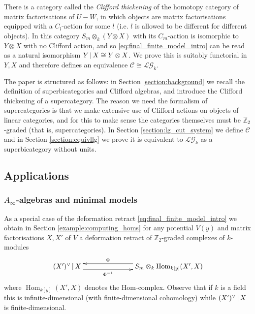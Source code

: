 \documentclass[english,letter paper,12pt,leqno]{article}
\theoremstyle{example}
\numberwithin{equation}{section}
\def\LG{\mathcal{LG}}
\def\Hom{\operatorname{Hom}}
\def\nZ{\mathds{Z}}
\def\L{\mathcal{C}}
\begin{document}
There is a category called the \emph{Clifford thickening} of the homotopy category of matrix factorisations of $U - W$, in which objects are matrix factorisations equipped with a $C_l$-action for some $l$ (i.e. $l$ is allowed to be different for different objects). In this category $S_m \otimes_{k} ( Y \otimes X )$ with its $C_m$-action is isomorphic to $Y \otimes X$ with no Clifford action, and so \eqref{eq:final_finite_model_intro} can be read as a natural isomorphism $Y \,|\, X \cong Y \otimes X$. We prove this is suitably functorial in $Y,X$ and therefore defines an equivalence $\L \cong \LG_k$.

\vspace{0.5cm}

The paper is structured as follows: in Section \ref{section:background} we recall the definition of superbicategories and Clifford algebras, and introduce the Clifford thickening of a supercategory. The reason we need the formalism of supercategories is that we make extensive use of Clifford actions on objects of linear categories, and for this to make sense the categories themselves must be $\nZ_2$-graded (that is, supercategories). In Section \ref{section:lg_cut_system} we define $\L$ and in Section \ref{section:equivllg} we prove it is equivalent to $\LG_k$ as a superbicategory without units. 

\subsection{Applications}\label{section:intro_appli}

\subsubsection{$A_\infty$-algebras and minimal models}

As a special case of the deformation retract \eqref{eq:final_finite_model_intro} we obtain in Section \ref{example:computing_homs} for any potential $V(y)$ and matrix factorisations $X,X'$ of $V$ a deformation retract of $\nZ_2$-graded complexes of $k$-modules
\begin{equation}\label{eq:final_finite_model_hom}
\xymatrix@C+4pc{
(X')^{\vee} \l X \ar@<-1ex>[r]_-{\Phi^{-1}} & S_m \otimes_{k} \Hom_{k[y]}(X', X) \ar@<-1ex>[l]_-{\Phi}
}
\end{equation}
where $\Hom_{k[y]}(X',X)$ denotes the Hom-complex. Observe that if $k$ is a field this is infinite-dimensional (with finite-dimensional cohomology) while $(X')^{\vee} \,|\, X$ is finite-dimensional.
\end{document}
